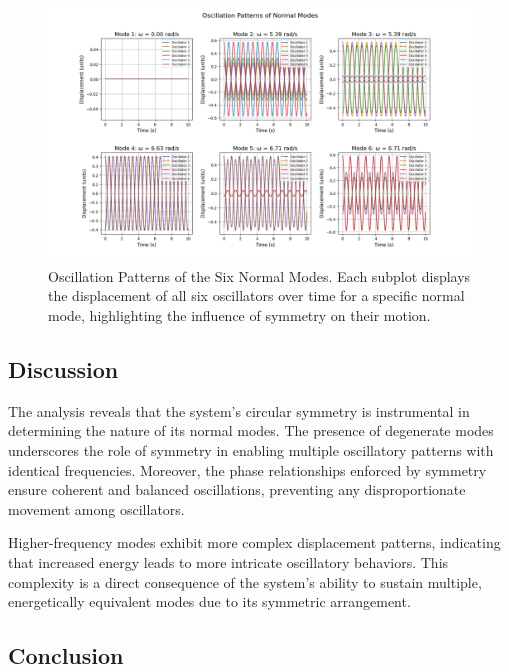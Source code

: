 \documentclass[12pt]{report} %
\begin{document}
\begin{figure}[h]
    \centering
    \includegraphics[width=\textwidth]{oscillation_patterns_part4.png} %
    \caption{Oscillation Patterns of the Six Normal Modes. Each subplot displays the displacement of all six oscillators over time for a specific normal mode, highlighting the influence of symmetry on their motion.}
    \label{fig:oscillation_patterns_part4}
\end{figure}

\subsection{Discussion}
\label{subsec:part4_discussion}

The analysis reveals that the system's circular symmetry is instrumental in determining the nature of its normal modes. The presence of degenerate modes underscores the role of symmetry in enabling multiple oscillatory patterns with identical frequencies. Moreover, the phase relationships enforced by symmetry ensure coherent and balanced oscillations, preventing any disproportionate movement among oscillators.

Higher-frequency modes exhibit more complex displacement patterns, indicating that increased energy leads to more intricate oscillatory behaviors. This complexity is a direct consequence of the system's ability to sustain multiple, energetically equivalent modes due to its symmetric arrangement.

\subsection{Conclusion}
\label{subsec:part4_conclusion}
\end{document}
